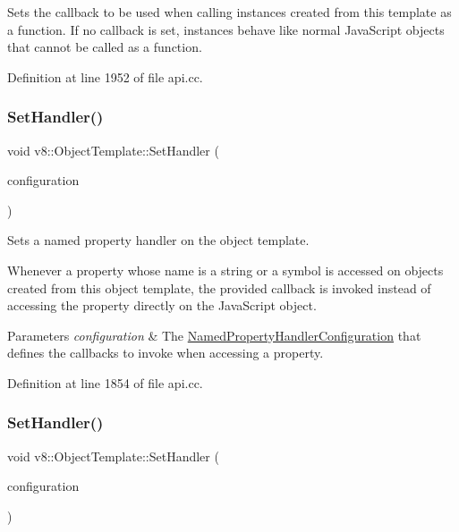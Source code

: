Sets the callback to be used when calling instances created from this template as a function. If no callback is set, instances behave like normal Java\+Script objects that cannot be called as a function. 

Definition at line 1952 of file api.\+cc.

\mbox{\label{classv8_1_1ObjectTemplate_a3d5666f1e9b0f46df6b4dbb7cfbb6114}} 
\subsubsection{\texorpdfstring{Set\+Handler()}{SetHandler()}\hspace{0.1cm}{\footnotesize\ttfamily [1/2]}}
{\footnotesize\ttfamily void v8\+::\+Object\+Template\+::\+Set\+Handler (\begin{DoxyParamCaption}\item[{const \mbox{\hyperlink{structv8_1_1NamedPropertyHandlerConfiguration}{Named\+Property\+Handler\+Configuration}} \&}]{configuration }\end{DoxyParamCaption})}

Sets a named property handler on the object template.

Whenever a property whose name is a string or a symbol is accessed on objects created from this object template, the provided callback is invoked instead of accessing the property directly on the Java\+Script object.


\begin{DoxyParams}{Parameters}
{\em configuration} & The \mbox{\hyperlink{structv8_1_1NamedPropertyHandlerConfiguration}{Named\+Property\+Handler\+Configuration}} that defines the callbacks to invoke when accessing a property. \\
\hline
\end{DoxyParams}


Definition at line 1854 of file api.\+cc.

\mbox{\label{classv8_1_1ObjectTemplate_abc92c2889776a5a1ef6831f9c3da3783}} 
\subsubsection{\texorpdfstring{Set\+Handler()}{SetHandler()}\hspace{0.1cm}{\footnotesize\ttfamily [2/2]}}
{\footnotesize\ttfamily void v8\+::\+Object\+Template\+::\+Set\+Handler (\begin{DoxyParamCaption}\item[{const \mbox{\hyperlink{structv8_1_1IndexedPropertyHandlerConfiguration}{Indexed\+Property\+Handler\+Configuration}} \&}]{configuration }\end{DoxyParamCaption})}

